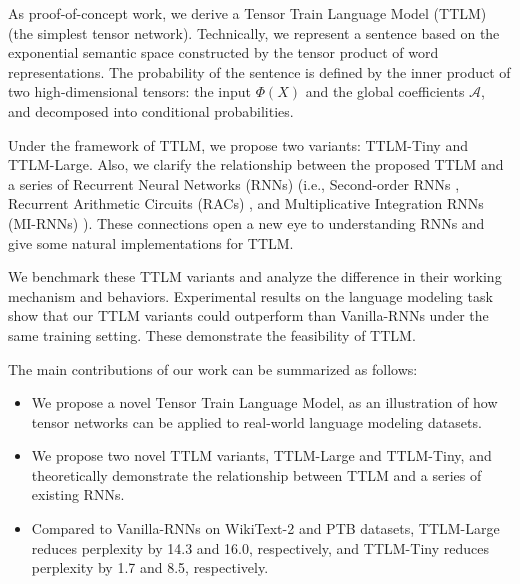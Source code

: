 As proof-of-concept work, we derive a Tensor Train Language Model (TTLM) (the simplest tensor network).  Technically, we represent a sentence based on the exponential semantic space constructed by the tensor product of word representations. The probability of the sentence is defined by the inner product of two high-dimensional tensors: the input $\Phi(X)$ and the global 
coefficients $\mathcal{A}$, and decomposed into conditional probabilities.  

Under the framework of TTLM,  we propose two variants:  TTLM-Tiny and TTLM-Large. Also, we clarify the relationship between the proposed TTLM and a series of Recurrent Neural Networks (RNNs) (i.e., Second-order RNNs \citep{goudreau1994first},  Recurrent Arithmetic Circuits (RACs) \citep{levine2018benefits}, and Multiplicative Integration RNNs (MI-RNNs) \citep{wu_multiplicative_2016}). These connections open a new eye to understanding RNNs and give some natural implementations for TTLM.


We benchmark these TTLM variants and analyze the difference in their working mechanism and behaviors. Experimental results on the language modeling task show that our TTLM variants could outperform than Vanilla-RNNs under the same training setting. These demonstrate the feasibility of TTLM.
 
 
The main contributions of our work can be summarized as follows:
\begin{itemize}
    \item We propose a novel Tensor Train Language Model, as an illustration of how tensor networks can be applied to real-world language modeling datasets. 
    \item We propose two novel TTLM variants, TTLM-Large and TTLM-Tiny, and theoretically demonstrate the relationship between  TTLM and a series of existing RNNs.
    \item Compared to Vanilla-RNNs on WikiText-2 and PTB datasets, TTLM-Large reduces perplexity by 14.3 and 16.0, respectively, and TTLM-Tiny reduces perplexity by 1.7 and 8.5, respectively.
\end{itemize}


